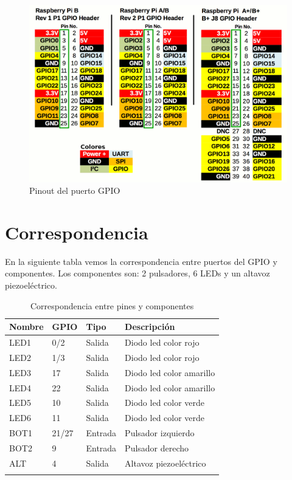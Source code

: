 \begin{figure}[h]
  \centering
    \includegraphics[width=14cm]{graphs/RaspberryGPIO.png}
  \caption{Pinout del puerto GPIO}
  \label{fig:pinout}
\end{figure}

\section{Correspondencia}

En la siguiente tabla vemos la correspondencia entre puertos del GPIO y
componentes. Los componentes son: 2 pulsadores, 6 LEDs y un altavoz
piezoeléctrico.

\begin{longtable}{ p{1.8cm} | p{1.2cm} | p{2cm} | p{5cm}}
\hline
{\bf Nombre} & {\bf GPIO} & {\bf Tipo} & {\bf Descripción} \\ \hline
LED1 & 0/2 & Salida & Diodo led color rojo \\ \hline
LED2 & 1/3 & Salida & Diodo led color rojo \\ \hline
LED3 & 17 & Salida & Diodo led color amarillo \\ \hline
LED4 & 22 & Salida & Diodo led color amarillo \\ \hline
LED5 & 10 & Salida & Diodo led color verde \\ \hline
LED6 & 11 & Salida & Diodo led color verde \\ \hline
BOT1 & 21/27 & Entrada & Pulsador izquierdo \\ \hline
BOT2 & 9 & Entrada & Pulsador derecho \\ \hline
ALT & 4 & Salida & Altavoz piezoeléctrico \\ \hline
\caption{Correspondencia entre pines y componentes}
\label{tab:berry}
\end{longtable}

